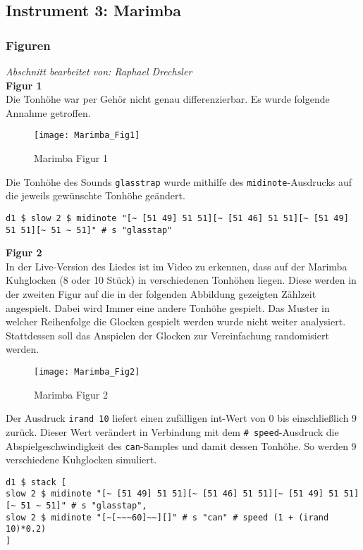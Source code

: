 \documentclass[
10pt, %
a4paper, %
oneside, %
headinclude,footinclude, %
BCOR5mm, %
]{scrartcl}
\begin{document}
\subsection{Instrument 3: Marimba}
\subsubsection{Figuren}
\textit{Abschnitt bearbeitet von: Raphael Drechsler}\\

\noindent \textbf{Figur 1}\\
Die Tonhöhe war per Gehör nicht genau differenzierbar. Es wurde folgende Annahme getroffen.
\begin{figure}[h]
	\centering 
	\texttt{[image: Marimba\_Fig1]} 
	\caption{Marimba Figur 1}
\end{figure}

\noindent Die Tonhöhe des Sounds \verb|glasstrap| wurde mithilfe des \verb|midinote|-Ausdrucks \cite{tid6} auf die jeweils gewünschte Tonhöhe geändert.
\begin{lstlisting}
d1 $ slow 2 $ midinote "[~ [51 49] 51 51][~ [51 46] 51 51][~ [51 49] 51 51][~ 51 ~ 51]" # s "glasstap"
\end{lstlisting}


\noindent \textbf{Figur 2}\\
In der Live-Version des Liedes ist im Video zu erkennen, dass auf der Marimba Kuhglocken (8 oder 10 Stück) in verschiedenen Tonhöhen liegen. Diese werden in der zweiten Figur auf die in der folgenden Abbildung gezeigten Zählzeit angespielt. Dabei wird Immer eine andere Tonhöhe gespielt. Das Muster in welcher Reihenfolge die Glocken gespielt werden wurde nicht weiter analysiert. Stattdessen soll das Anspielen der Glocken zur Vereinfachung randomisiert werden.
\begin{figure}[h]
	\centering 
	\texttt{[image: Marimba\_Fig2]} 
	\caption{Marimba Figur 2}
\end{figure}

\noindent Der Ausdruck \verb|irand 10| \cite{tid7} liefert einen zufälligen int-Wert von 0 bis einschließlich 9 zurück. Dieser Wert verändert in Verbindung mit dem \verb|# speed|-Ausdruck\cite{tid8} die Abspielgeschwindigkeit des \verb|can|-Samples und damit dessen Tonhöhe. So werden 9 verschiedene Kuhglocken simuliert.
\begin{lstlisting}
d1 $ stack [
slow 2 $ midinote "[~ [51 49] 51 51][~ [51 46] 51 51][~ [51 49] 51 51][~ 51 ~ 51]" # s "glasstap",
slow 2 $ midinote "[~[~~~60]~~][]" # s "can" # speed (1 + (irand 10)*0.2)
]
\end{lstlisting} 
\end{document}
